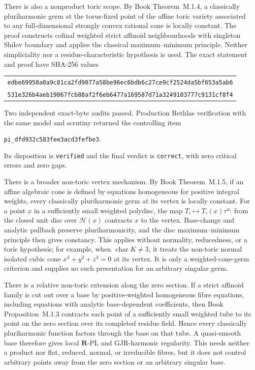 \documentclass[11pt,a4paper]{article}
\theoremstyle{definition}
\theoremstyle{remark}
\begin{document}
There is also a nonproduct toric scope.  By
Book Theorem~M.1.4, a classically pluriharmonic germ
at the torus-fixed point of the affine toric variety associated to any
full-dimensional strongly convex rational cone is locally constant.  The
proof constructs cofinal weighted strict affinoid neighbourhoods with
singleton Shilov boundary and applies the classical maximum--minimum
principle.  Neither simpliciality nor a residue-characteristic hypothesis is
used.  The exact statement and proof have SHA-256 values
\begin{center}
\small
\begin{tabular}{@{}c@{}}
\nolinkurl{edbe69950a0a9c81ca2fd9077a58be96ec6bdb6c27ce9cf2524da5bf653a5ab6}\\
\nolinkurl{531e326b4aeb19067fcb88af2f6eb6477a169587d71a3249103777c9131cf8f4}
\end{tabular}
\end{center}
Two independent exact-byte audits passed.  Production Rethlas verification
with the same model and scrutiny returned the controlling item
\begin{center}
\small
\nolinkurl{pi_dfd932c583fee3acd3fefbe3}.
\end{center}
Its disposition is \texttt{verified} and the final verdict is
\texttt{correct}, with zero critical errors and zero gaps.

There is a broader non-toric vertex mechanism.  By
Book Theorem~M.1.5, if an affine
algebraic cone is defined by equations homogeneous for positive integral
weights, every classically pluriharmonic germ at its vertex is locally
constant.  For a point \(x\) in a sufficiently small weighted polydisc, the
map \(T_i\mapsto T_i(x)\tau^{w_i}\) from the closed unit disc over
\(\mathscr H(x)\) contracts \(x\) to the vertex.  Base-change and analytic
pullback preserve pluriharmonicity, and the disc maximum--minimum principle
then gives constancy.  This applies without normality, reducedness, or a
toric hypothesis; for example, when \(\operatorname{char}K\ne 3\), it treats
the non-toric normal isolated cubic cone \(x^3+y^3+z^3=0\) at its vertex.
It is only a weighted-cone-germ
criterion and supplies no such presentation for an arbitrary singular germ.

There is a relative non-toric extension along the zero section.  If a strict
affinoid family is cut out over a base by positive-weighted homogeneous fibre
equations, including equations with analytic base-dependent coefficients,
then Book Proposition~M.1.3 contracts each
point of a sufficiently small weighted tube to its point on the zero section
over its completed residue field.  Hence every classically pluriharmonic
function factors through the base on that tube.  A quasi-smooth base therefore
gives local \(\mathbf R\)-PL and GJR-harmonic regularity.  This needs neither
a product nor flat, reduced, normal, or irreducible fibres, but it does not
control arbitrary points away from the zero section or an arbitrary singular
base.
\end{document}
